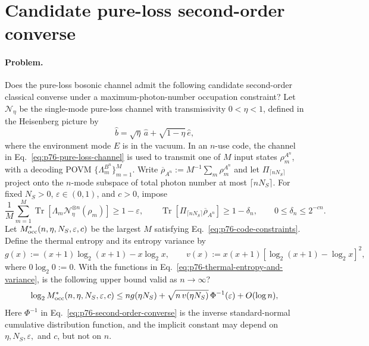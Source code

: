 \section{Candidate pure-loss second-order converse}
\label{sec:op_89fb664ba06ba5de}

\paragraph{Problem.}
Does the pure-loss bosonic channel admit the following candidate second-order
classical converse under a maximum-photon-number occupation constraint?  Let
$\mathcal N_\eta$ be the single-mode pure-loss channel with transmissivity
$0<\eta<1$, defined in the Heisenberg picture by
\begin{equation}
  \hat b=\sqrt{\eta}\,\hat a+\sqrt{1-\eta}\,\hat e,
  \label{eq:p76-pure-loss-channel}
\end{equation}
where the environment mode $E$ is in the vacuum.  In an $n$-use code, the
channel in Eq.~\eqref{eq:p76-pure-loss-channel} is used to transmit one of
$M$ input states $\rho_m^{A^n}$, with a decoding POVM
$\{\Lambda_m^{B^n}\}_{m=1}^M$.  Write
$\overline\rho_{A^n}:=M^{-1}\sum_m\rho_m^{A^n}$ and let
$\Pi_{\lceil nN_S\rceil}$ project onto the $n$-mode subspace of total photon
number at most $\lceil nN_S\rceil$.  For fixed $N_S>0$,
$\varepsilon\in(0,1)$, and $c>0$, impose
\begin{equation}
  \frac1M\sum_{m=1}^M
    \operatorname{Tr}\!\left[
      \Lambda_m\mathcal N_\eta^{\otimes n}(\rho_m)
    \right]
    \geq1-\varepsilon,
  \qquad
  \operatorname{Tr}\!\left[
    \Pi_{\lceil nN_S\rceil}\overline\rho_{A^n}
  \right]
    \geq1-\delta_n,
  \qquad
  0\leq\delta_n\leq2^{-cn}.
  \label{eq:p76-code-constraints}
\end{equation}
Let $M^*_{\rm occ}(n,\eta,N_S,\varepsilon,c)$ be the largest $M$ satisfying
Eq.~\eqref{eq:p76-code-constraints}.  Define the thermal entropy and its
entropy variance by
\begin{equation}
  g(x):=(x+1)\log_2(x+1)-x\log_2x,
  \qquad
  v(x):=x(x+1)
    \left[\log_2(x+1)-\log_2x\right]^2,
  \label{eq:p76-thermal-entropy-and-variance}
\end{equation}
where $0\log_2 0:=0$.  With the functions in
Eq.~\eqref{eq:p76-thermal-entropy-and-variance}, is the following upper bound
valid as $n\to\infty$?
\begin{equation}
  \log_2 M^*_{\rm occ}(n,\eta,N_S,\varepsilon,c)
  \leq ng(\eta N_S)
    +\sqrt{n\,v(\eta N_S)}\,\Phi^{-1}(\varepsilon)
    +O(\log n),
  \label{eq:p76-second-order-converse}
\end{equation}
Here $\Phi^{-1}$ in Eq.~\eqref{eq:p76-second-order-converse} is the inverse
standard-normal cumulative distribution function, and the implicit constant
may depend on $\eta,N_S,\varepsilon,$ and $c$, but not on $n$.

